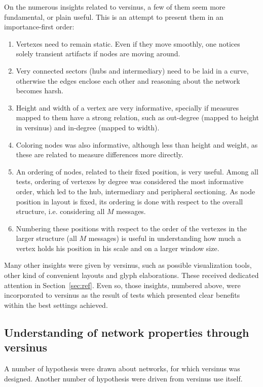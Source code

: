 \documentclass[%
 aip,
 jmp,%
 amsmath,amssymb,
 reprint,%
]{revtex4-1}
\begin{document}
On the numerous insights related to versinus, a few of them seem more fundamental, or plain useful. This is an attempt to present them in an importance-first order:
\begin{enumerate}
    \item Vertexes need to remain static. Even if they move smoothly, one notices solely transient artifacts if nodes are moving around.
    \item Very connected sectors (hubs and intermediary) need to be laid in a curve, otherwise the edges enclose each other and reasoning about the network becomes harsh.
    \item Height and width of a vertex are very informative, specially if measures mapped to them have a strong relation, such as out-degree (mapped to height in versinus) and in-degree (mapped to width).
    \item Coloring nodes was also informative, although less than height and weight, as these are related to measure differences more directly.
    \item An ordering of nodes, related to their fixed position, is very useful. Among all tests, ordering of vertexes by degree was considered the most informative order, which led to the hub, intermediary and peripheral sectioning. As node position in layout is fixed, its ordering is done with respect to the overall structure, i.e. considering all $M$ messages.
    \item  Numbering these positions with respect to the order of the vertexes in the larger structure (all $M$ messages) is useful in understanding how much a vertex holds his position in his scale and on a larger window size.
\end{enumerate}

Many other insights were given by versinus, such as possible visualization tools, other kind of convenient layouts and glyph elaborations. These received dedicated attention in Section~\ref{sec:ref}.
Even so, those insights, numbered above, were incorporated to versinus as the result of tests which presented clear benefits within the best settings achieved.

\subsection{Understanding of network properties through versinus}
A number of hypothesis were drawn about networks, for which versinus
was designed. Another number of hypothesis were driven from versinus use itself.
\end{document}
